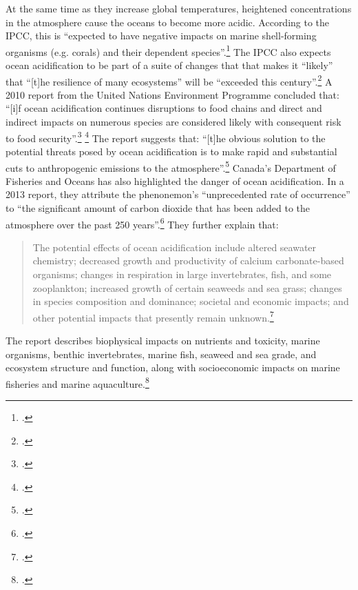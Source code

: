 At the same time as they increase global temperatures, heightened  concentrations in the atmosphere cause the oceans to become more acidic.
According to the IPCC, this is ``expected to have negative impacts on marine shell-forming organisms (e.g. corals) and their dependent species''.\footcite[][p. 52]{IPCCar4_syr}
The IPCC also expects ocean acidification to be part of a suite of changes that that makes it ``likely'' that ``[t]he resilience of many ecosystems'' will be ``exceeded this century''.\footcite[][p. 48]{IPCCar4_syr}
A 2010 report from the United Nations Environment Programme concluded that: ``[i]f ocean acidification continues 
disruptions to food chains and direct and indirect impacts on numerous species are considered likely with consequent risk to food security''.\footcite[][p. 8]{UNEPOceanAcid} \footcite[See also: ][]{AcidThreatFish}
The report suggests that: ``[t]he obvious solution to the potential threats posed by ocean acidification is to make rapid and substantial cuts to anthropogenic  emissions to the atmosphere''.\footcite[][p. 8]{UNEPOceanAcid}
Canada's Department of Fisheries and Oceans has also highlighted the danger of ocean acidification.
In a 2013 report, they attribute the phenonemon's ``unprecedented rate of occurrence'' to ``the significant amount of carbon dioxide that has been added to the atmosphere over the past 250 years''.\footcite[][p. 4]{FaOAcid}
They further explain that:
\begin{quote}
The potential effects of ocean acidification include altered seawater chemistry; decreased growth and productivity of calcium carbonate-based organisms; changes in respiration in large invertebrates, fish, and some zooplankton; increased growth of certain seaweeds and sea grass; changes in species composition and dominance; societal and economic impacts; and other potential impacts that presently remain unknown.\footcite[][p. 6]{FaOAcid}
\end{quote}
The report describes biophysical impacts on nutrients and toxicity, marine organisms, benthic invertebrates, marine fish, seaweed and sea grade, and ecosystem structure and function, along with socioeconomic impacts on marine fisheries and marine aquaculture.\footcite[][p. 13]{FaOAcid}



